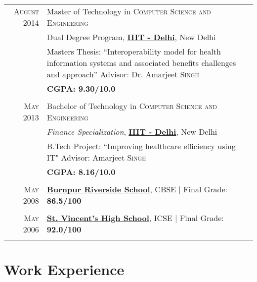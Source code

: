 \documentclass[a4paper,10pt]{article} %
\begin{document}
\begin{tabular}{rp{13cm}}	
\textsc{August} 2014 & Master of Technology in \textsc{Computer Science and Engineering}\\
& Dual Degree Program, \href{http://www.iiitd.ac.in}{\textbf{IIIT - Delhi}}, New Delhi\\
& Masters Thesis: ``Interoperability model for health information systems and \newline associated benefits challenges and approach'' \newline \small Advisor: Dr. Amarjeet \textsc{Singh}\\
&\normalsize \textbf{\textsc{CGPA}: 9.30/10.0}\\
&\\


\textsc{May} 2013& Bachelor of Technology in \textsc{}\textsc{Computer Science and Engineering} \\&
 \emph{Finance Specialization}, \href{http://www.iiitd.ac.in}{\textbf{IIIT - Delhi}}, New Delhi\\
& B.Tech Project: ``Improving healthcare efficiency using IT" \newline \small Advisor: Amarjeet \textsc{Singh}\\
&\normalsize \textbf{\textsc{CGPA}: 8.16/10.0} \\
&\\


\textsc{May} 2008& \href{http://www.brsschool.org/}{\textbf{Burnpur Riverside School}}, CBSE | Final Grade:\textbf{ 86.5/100}\\
&\\


\textsc{May} 2006& \href{http://svsasansol.com/}{\textbf{St. Vincent's High School}}, ICSE | Final Grade:\textbf{ 92.0/100}\\
&\\
\end{tabular}


\section{\color{red} Work Experience}
\end{document}
